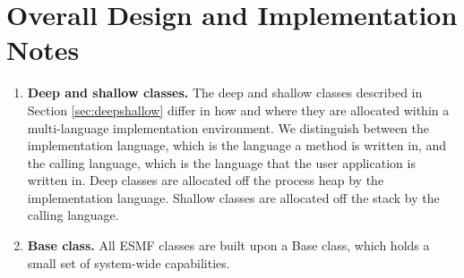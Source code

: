 %



\section{Overall Design and Implementation Notes}
\label{sec:overallimpl}

\begin{enumerate}

\item {\bf Deep and shallow classes.}  The deep and shallow classes 
described in Section \ref{sec:deepshallow} differ in how and where they
are allocated within a multi-language implementation environment.  We
distinguish between the implementation language, which is the language
a method is written in, and the calling language, which is the language
that the user application is written in.  Deep classes are allocated 
off the process heap by the implementation language.  Shallow classes
are allocated off the stack by the calling language.  

\item {\bf Base class.} All ESMF classes are built upon a Base class,
which holds a small set of system-wide capabilities.  

\end{enumerate}
